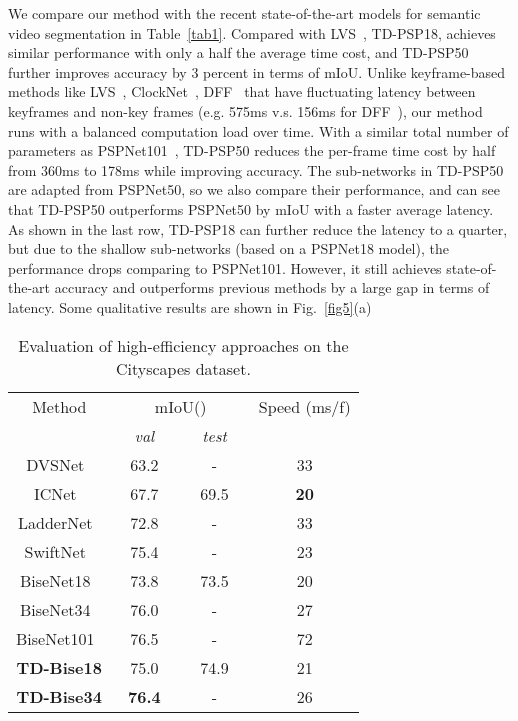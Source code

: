 \documentclass[10pt,twocolumn,letterpaper]{article}
\makeatletter
\renewcommand{\paragraph}{\@startsection{paragraph}{4}{\z@}{2.25ex \@plus 1ex \@minus .2ex}{-1em}{\normalfont\normalsize\bfseries}}
\makeatother
\begin{document}
\paragraph{Cityscapes Dataset.}
We compare our method with the recent state-of-the-art models for semantic video segmentation in Table~\ref{tab1}. Compared with LVS~\cite{li2018low}, TD-PSP18, achieves similar performance with only a half the average time cost, and TD-PSP50 further improves accuracy by 3 percent in terms of mIoU.
Unlike keyframe-based methods like LVS~\cite{li2018low},  ClockNet~\cite{shelhamer2016clockwork}, DFF~\cite{zhu2017deep} that have fluctuating latency between keyframes and non-key frames (e.g. 575ms v.s. 156ms for DFF~\cite{zhu2017deep}), our method runs with a balanced computation load over time.
With a similar total number of parameters as PSPNet101~\cite{zhao2017pyramid}, TD-PSP50 reduces the per-frame time cost by half from 360ms to 178ms while improving accuracy.
The sub-networks in  TD-PSP50 are adapted from PSPNet50, so we also compare their performance, and can see that TD-PSP50 outperforms PSPNet50 by  mIoU with a faster average latency. 
As shown in the last row, TD-PSP18 can further reduce the latency to a quarter, but due to the shallow sub-networks (based on a PSPNet18 model), the performance drops comparing to PSPNet101.
However, it still achieves state-of-the-art accuracy and outperforms previous methods by a large gap in terms of latency.
Some qualitative results are shown in Fig.~\ref{fig5}(a)

\begin{table}
\centering
\begin{tabular}{ |c|cc|c|} 
\hline
{Method}       &\multicolumn{2}{c|}{{mIoU()}}     &{Speed (ms/f)}  \\
                     &{~~\textit{val}~~} &{~~\textit{test}~~}     &{}     \\
 \hline 
 \hline 
 \small{DVSNet~\cite{xu2018dynamic} }                       &63.2 &-    &33 \\ 
 \small{ICNet~\cite{zhao2018icnet} }                       &67.7 &69.5    &\textbf{20} \\ 
 \small{LadderNet~\cite{kreso2017ladder} }                 &72.8 &-       &33 \\ 
 \small{SwiftNet~\cite{orsic2019defense} }                 &75.4 &-    &23 \\ 
 \hline  
 \small{BiseNet18~\cite{yu2018bisenet}}          &73.8 &73.5  &20\\  
 \small{BiseNet34~\cite{yu2018bisenet}}          &76.0 &-  &27\\ 
 \small{BiseNet101~\cite{yu2018bisenet}}          &76.5 &-  &72\\ 
 \hline 
 \small{\textbf{TD-Bise18}}                   &75.0 &74.9  &21\\ 
 \small{\textbf{TD-Bise34}}                   &\textbf{76.4} &-       & 26 \\ 
 \hline
\end{tabular}
\vspace{0.1cm}
\caption{\small{Evaluation of high-efficiency approaches on the Cityscapes dataset.}}
\label{tab2}
\vspace{-0.5cm}
\end{table}
\end{document}
